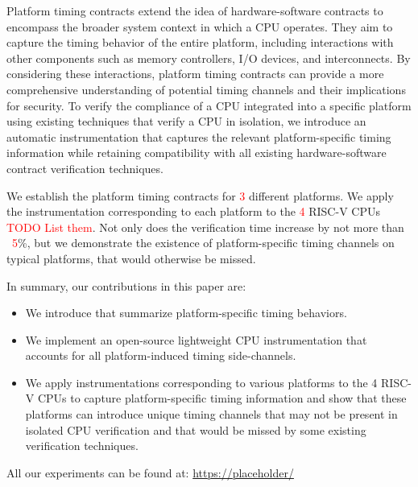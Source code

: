 Platform timing contracts extend the idea of hardware-software contracts to encompass the broader system context in which a CPU operates.
They aim to capture the timing behavior of the entire platform, including interactions with other components such as memory controllers, I/O devices, and interconnects.
By considering these interactions, platform timing contracts can provide a more comprehensive understanding of potential timing channels and their implications for security.
To verify the compliance of a CPU integrated into a specific platform using existing techniques that verify a CPU in isolation, we introduce an automatic instrumentation that captures the relevant platform-specific timing information while retaining compatibility with all existing hardware-software contract verification techniques.

We establish the platform timing contracts for \textcolor{red}{3} different platforms.
We apply the instrumentation corresponding to each platform to the \textcolor{red}{4} RISC-V CPUs \textcolor{red}{TODO List them}.
Not only does the verification time increase by not more than ~\textcolor{red}{5}\%, but we demonstrate the existence of platform-specific timing channels on typical platforms, that would otherwise be missed.

In summary, our contributions in this paper are:
\begin{itemize}
    \item We introduce \pics that summarize platform-specific timing behaviors.
    \item We implement an open-source lightweight CPU instrumentation that accounts for all platform-induced timing side-channels.
    \item We apply instrumentations corresponding to various platforms to the 4 RISC-V CPUs to capture platform-specific timing information and show that these platforms can introduce unique timing channels that may not be present in isolated CPU verification and that would be missed by some existing verification techniques.
\end{itemize}

\vspace*{0.5em}
All our experiments can be found at: \url{https://placeholder/} 
